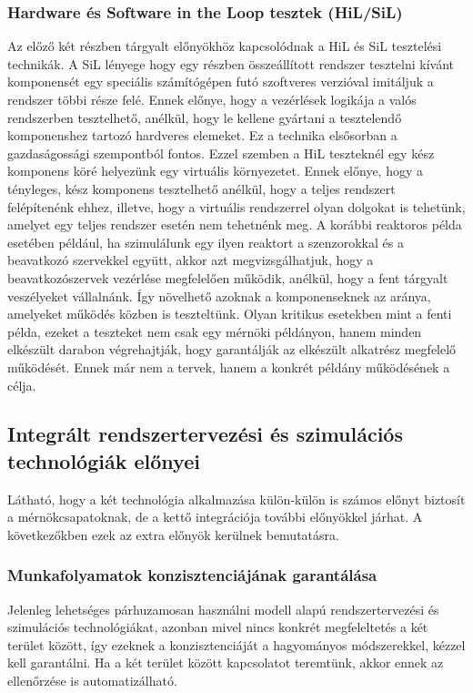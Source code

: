         \subsubsection{Hardware és Software in the Loop tesztek (HiL/SiL)}
        Az előző két részben tárgyalt előnyökhöz kapcsolódnak a HiL és SiL tesztelési technikák.
        A SiL lényege hogy egy részben összeállított rendszer tesztelni kívánt komponensét egy speciális számítógépen futó szoftveres verzióval imitáljuk a rendszer többi része felé.
        Ennek előnye, hogy a vezérlések logikája a valós rendszerben tesztelhető, anélkül, hogy le kellene gyártani a tesztelendő komponenshez tartozó hardveres elemeket.
        Ez a technika elsősorban a gazdaságossági szempontból fontos.
        Ezzel szemben a HiL teszteknél egy kész komponens köré helyezünk egy virtuális környezetet.
        Ennek előnye, hogy a tényleges, kész komponens tesztelhető anélkül, hogy a teljes rendszert felépítenénk ehhez, illetve, hogy a virtuális rendszerrel olyan dolgokat is tehetünk, amelyet egy teljes rendszer esetén nem tehetnénk meg.
        A korábbi reaktoros példa esetében például, ha szimulálunk egy ilyen reaktort a szenzorokkal és a beavatkozó szervekkel együtt, akkor azt megvizsgálhatjuk, hogy a beavatkozószervek vezérlése megfelelően működik, anélkül, hogy a fent tárgyalt veszélyeket vállalnánk.
        Így növelhető azoknak a komponenseknek az aránya, amelyeket működés közben is teszteltünk.
        Olyan kritikus esetekben mint a fenti példa, ezeket a teszteket nem csak egy mérnöki példányon, hanem minden elkészült darabon végrehajtják, hogy garantálják az elkészült alkatrész megfelelő működését.
        Ennek már nem a tervek, hanem a konkrét példány működésének a célja.

    \subsection{Integrált rendszertervezési és szimulációs technológiák előnyei}
    Látható, hogy a két technológia alkalmazása külön-külön is számos előnyt biztosít a mérnökcsapatoknak, de a kettő integrációja további előnyökkel járhat.
    A következőkben ezek az extra előnyök kerülnek bemutatásra.

        \subsubsection{Munkafolyamatok konzisztenciájának garantálása}
        Jelenleg lehetséges párhuzamosan használni modell alapú rendszertervezési és szimulációs technológiákat, azonban mivel nincs konkrét megfeleltetés a két terület között, így ezeknek a konzisztenciáját a hagyományos módszerekkel, kézzel kell garantálni.
        Ha a két terület között kapcsolatot teremtünk, akkor ennek az ellenőrzése is automatizálható.


